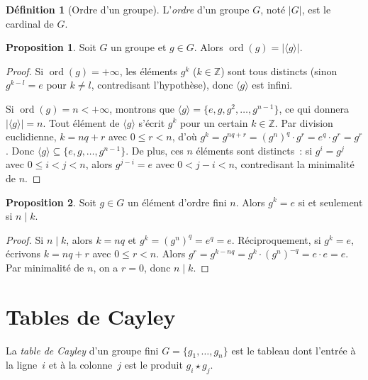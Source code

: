 \documentclass[12pt,a4paper,openany]{book}
\theoremstyle{definition}
\newtheorem{definition}{Définition}[chapter]
\newtheorem{proposition}{Proposition}[chapter]
\newcommand{\Z}{\mathbb{Z}}
\DeclareMathOperator{\ord}{ord}
\newcommand{\abs}[1]{\lvert #1 \rvert}
\newcommand{\gen}[1]{\langle #1 \rangle}
\begin{document}
\begin{definition}[Ordre d'un groupe]
\label{def:ordre-groupe}
L'\emph{ordre} d'un groupe $G$, noté $\abs{G}$, est le cardinal de $G$.
\end{definition}

\begin{proposition}
\label{prop:ordre-gen}
Soit $G$ un groupe et $g \in G$. Alors $\ord(g) = \abs{\gen{g}}$.
\end{proposition}

\begin{proof}
Si $\ord(g) = +\infty$, les éléments $g^k$ ($k \in \Z$) sont tous distincts (sinon
$g^{k-l} = e$ pour $k \neq l$, contredisant l'hypothèse), donc $\gen{g}$ est infini.

Si $\ord(g) = n < +\infty$, montrons que $\gen{g} = \{e, g, g^2, \ldots, g^{n-1}\}$,
ce qui donnera $\abs{\gen{g}} = n$. Tout élément de $\gen{g}$ s'écrit $g^k$ pour un
certain $k \in \Z$. Par division euclidienne, $k = nq + r$ avec $0 \leq r < n$, d'où
$g^k = g^{nq+r} = (g^n)^q \cdot g^r = e^q \cdot g^r = g^r$. Donc $\gen{g} \subseteq
\{e, g, \ldots, g^{n-1}\}$. De plus, ces $n$ éléments sont distincts~: si $g^i = g^j$
avec $0 \leq i < j < n$, alors $g^{j-i} = e$ avec $0 < j - i < n$, contredisant la
minimalité de $n$.
\end{proof}

\begin{proposition}
\label{prop:gn-iff-divise}
Soit $g \in G$ un élément d'ordre fini $n$. Alors $g^k = e$ si et seulement si $n
\mid k$.
\end{proposition}

\begin{proof}
Si $n \mid k$, alors $k = nq$ et $g^k = (g^n)^q = e^q = e$. Réciproquement, si $g^k =
e$, écrivons $k = nq + r$ avec $0 \leq r < n$. Alors $g^r = g^{k - nq} = g^k \cdot
(g^n)^{-q} = e \cdot e = e$. Par minimalité de $n$, on a $r = 0$, donc $n \mid k$.
\end{proof}

\section{Tables de Cayley}
\label{sec:ch1-cayley}

La \emph{table de Cayley} d'un groupe fini $G = \{g_1, \ldots,
g_n\}$ est le tableau dont l'entrée à la ligne~$i$ et à la colonne~$j$ est le produit
$g_i \star g_j$.
\end{document}
